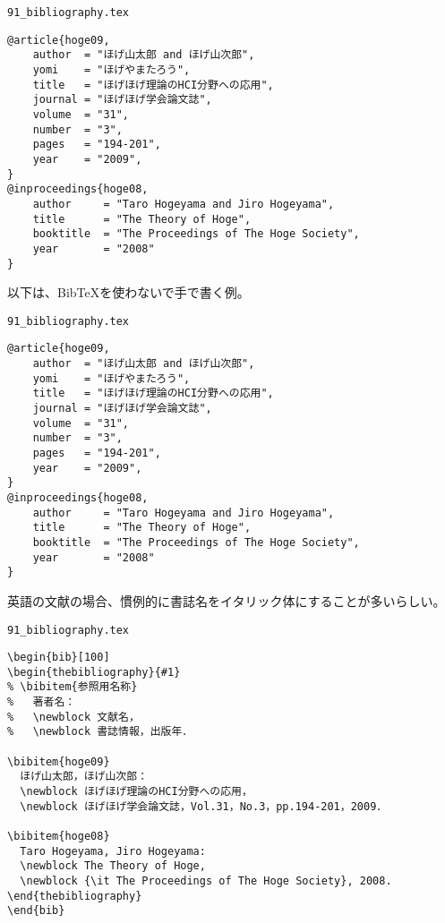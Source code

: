 \begin{itembox}[l]{{\tt 91\_bibliography.tex}}
\begin{verbatim}
@article{hoge09,
    author  = "ほげ山太郎 and ほげ山次郎",
    yomi    = "ほげやまたろう",
    title   = "ほげほげ理論のHCI分野への応用",
    journal = "ほげほげ学会論文誌",
    volume  = "31",
    number  = "3",
    pages   = "194-201",
    year    = "2009",
}
@inproceedings{hoge08,
    author     = "Taro Hogeyama and Jiro Hogeyama",
    title      = "The Theory of Hoge",
    booktitle  = "The Proceedings of The Hoge Society",
    year       = "2008"
}
\end{verbatim}
\end{itembox}


以下は、BibTeXを使わないで手で書く例。

\begin{itembox}[l]{{\tt 91\_bibliography.tex}}
\begin{verbatim}
@article{hoge09,
    author  = "ほげ山太郎 and ほげ山次郎",
    yomi    = "ほげやまたろう",
    title   = "ほげほげ理論のHCI分野への応用",
    journal = "ほげほげ学会論文誌",
    volume  = "31",
    number  = "3",
    pages   = "194-201",
    year    = "2009",
}
@inproceedings{hoge08,
    author     = "Taro Hogeyama and Jiro Hogeyama",
    title      = "The Theory of Hoge",
    booktitle  = "The Proceedings of The Hoge Society",
    year       = "2008"
}
\end{verbatim}
\end{itembox}


英語の文献の場合、慣例的に書誌名をイタリック体にすることが多いらしい。

\begin{itembox}[l]{{\tt 91\_bibliography.tex}}
\begin{verbatim}
\begin{bib}[100]
\begin{thebibliography}{#1}
% \bibitem{参照用名称}
%   著者名：
%   \newblock 文献名，
%   \newblock 書誌情報，出版年．

\bibitem{hoge09}
  ほげ山太郎，ほげ山次郎：
  \newblock ほげほげ理論のHCI分野への応用，
  \newblock ほげほげ学会論文誌，Vol.31，No.3，pp.194-201，2009．

\bibitem{hoge08}
  Taro Hogeyama, Jiro Hogeyama:
  \newblock The Theory of Hoge,
  \newblock {\it The Proceedings of The Hoge Society}, 2008.
\end{thebibliography}
\end{bib}
\end{verbatim}
\end{itembox}

